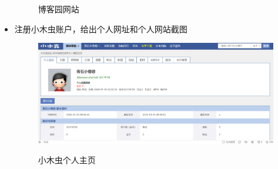 \documentclass{article}
\begin{document}
\begin{itemize}
\begin{figure}[h!]
	\label{fig:bokeyuanwangzhan}
	\caption{博客园网站}
\end{figure}
    \item 注册小木虫账户，给出个人网址和个人网站截图
    \begin{figure}[h!]
    	\centering
    	\includegraphics[scale=0.25]{xiaomuchonggeren}
    	\label{fig:xiaomuchonggeren}
    	\caption{小木虫个人主页}
    \end{figure}
\end{itemize}

\hspace*{\fill} \\



\end{document}
